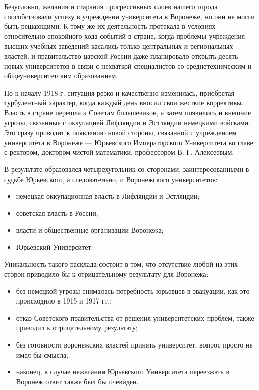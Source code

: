 Безусловно, желания и старания прогрессивных слоев нашего города способствовали успеху в учреждении университета в Воронеже, но они не могли быть решающими. К тому же их деятельность протекала в условиях относительно спокойного хода событий в стране, когда проблемы учреждения высших учебных заведений касались только центральных и региональных властей, и правительство царской России даже планировало открыть десять новых университетов в связи с нехваткой специалистов со среднетехническим и общеуниверситетским образованием.

Но к началу 1918 г. ситуация резко и качественно изменилась, приобретая турбулентный характер, когда каждый день вносил свои жесткие коррективы. Власть в стране перешла к Советам большевиков, а затем появились и внешние угрозы, связанные с оккупацией Лифляндии и Эстляндии немецкими войсками. Это сразу приводит к появлению новой стороны, связанной с учреждением университета в Воронеже --- Юрьевского Императорского Университета во главе с ректором, доктором чистой математики, профессором В. Г. Алексеевым.

В	результате образовался четырехугольник со сторонами, заинтересованными в судьбе Юрьевского,
а следовате\-льно, и Воронежского университетов:

\begin{itemize}
  \item немецкая оккупационная власть в Лифляндии и Эстляндии;
  \item советская власть в России;
  \item власти и общественные организации Воронежа;
  \item Юрьевский Университет.
\end{itemize}

Уникальность такого расклада состоит в том, что отсутствие любой из этих сторон приводило бы к отрицательному результату для Воронежа:
\begin{itemize}
  \item без немецкой угрозы снималась потребность юрьевцев в эвакуации, как это происходило в 1915 и 1917 гг.;
  \item отказ Советского правительства от решения университетских проблем, также приводил к отрицательному результату;
  \item без готовности воронежских властей принять университет, вопрос просто не имел бы смысла;
  \item наконец, в случае нежелания Юрьевского Университета переезжать в Воронеж ответ также был бы очевиден.
\end{itemize}

